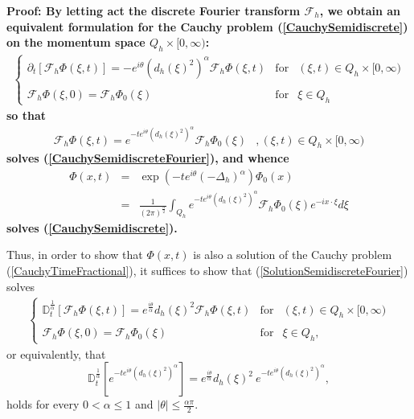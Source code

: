 \documentclass{elsarticle}
\newcommand{\proof}{\bf {Proof:} \rm}
\begin{document}
\proof
By letting act the discrete Fourier transform $\mathcal{F}_h$, we obtain an equivalent formulation for the Cauchy problem (\ref{CauchySemidiscrete}) on the momentum space $Q_h\times [0,\infty)$:
\begin{eqnarray}
	\label{CauchySemidiscreteFourier} \left\{\begin{array}{lll} 
		\partial_t\left[\mathcal{F}_h\Phi(\xi,t)\right]= -e^{i\theta}(d_h(\xi)^2)^{\alpha} \mathcal{F}_h\Phi(\xi,t) & \mbox{for} & (\xi,t)\in
		Q_h \times [0,\infty)
		\\ \ \\
		\mathcal{F}_h\Phi(\xi,0)=\mathcal{F}_h\Phi_0(\xi) & \mbox{for} & \xi \in Q_h
	\end{array}\right.
\end{eqnarray}
so that 
\begin{eqnarray}
	\label{SolutionSemidiscreteFourier}\mathcal{F}_h\Phi(\xi,t)= e^{-te^{i\theta}\left(d_h(\xi)^2\right)^\alpha} \mathcal{F}_h\Phi_0(\xi)& ,(\xi,t)\in Q_h \times [0,\infty)
\end{eqnarray}
solves (\ref{CauchySemidiscreteFourier}), and whence
\begin{eqnarray*}
	\Phi(x,t)&=&\exp(-te^{i\theta}(-\Delta_h)^\alpha)\Phi_0(x)\\
	&=&\displaystyle \frac{1}{(2\pi)^{\frac{n}{2}}}\int_{Q_h} e^{-te^{i\theta}\left(d_h(\xi)^2\right)^\alpha} \mathcal{F}_h\Phi_0(\xi) e^{-ix\cdot \xi} d\xi
\end{eqnarray*}
solves (\ref{CauchySemidiscrete}).

Thus, in order to show that $\Phi(x,t)$ is also a solution of the Cauchy problem (\ref{CauchyTimeFractional}), it suffices to show that (\ref{SolutionSemidiscreteFourier}) solves 
\begin{eqnarray}
	\label{CauchyTimeFractionalFourier} \left\{\begin{array}{lll} 
		\mathbb{D}_t^{\frac{1}{\alpha}}\left[\mathcal{F}_h\Phi(\xi,t)\right]=e^{\frac{i\theta}{\alpha}} d_h(\xi)^2\mathcal{F}_h\Phi(\xi,t) & \mbox{for} & (\xi,t)\in Q_h \times [0,\infty)
		\\ \ \\
		\mathcal{F}_h\Phi(\xi,0)=\mathcal{F}_h\Phi_0(\xi) & \mbox{for} & \xi\in Q_h,
	\end{array}\right.
\end{eqnarray}
or equivalently, that $$\mathbb{D}_t^{\frac{1}{\alpha}}\left[e^{-te^{i\theta}\left(d_h(\xi)^2\right)^\alpha}\right]=e^{\frac{i\theta}{\alpha}}d_h(\xi)^2~e^{-te^{i\theta}\left(d_h(\xi)^2\right)^\alpha},$$
holds for every $0<\alpha\leq 1$ and $|\theta|\leq \frac{\alpha \pi}{2}$.
\end{document}
